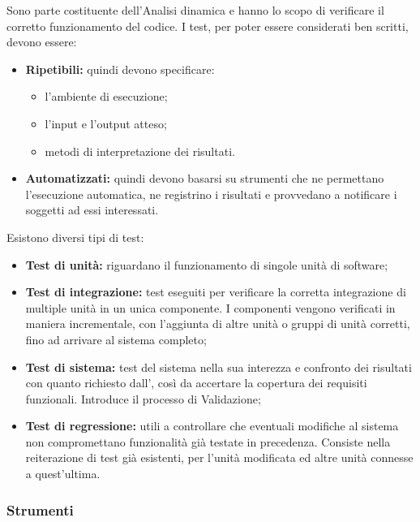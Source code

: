         Sono parte costituente dell'Analisi dinamica e hanno lo scopo di verificare il corretto funzionamento del codice. I test, per poter essere considerati ben scritti, devono essere:
        \begin{itemize}
          \item \textbf{Ripetibili:} quindi devono specificare:
            \begin{itemize}
              \item l'ambiente di esecuzione;
              \item l'input e l'output atteso;
              \item metodi di interpretazione dei risultati.
            \end{itemize}
          \item \textbf{Automatizzati:} quindi devono basarsi su strumenti che ne permettano l'esecuzione automatica, ne registrino i risultati e provvedano a notificare i soggetti ad essi interessati.
        \end{itemize}
        Esistono diversi tipi di test:
        \begin{itemize}
          \item \textbf{Test di unità:} riguardano il funzionamento di singole unità di software;
          \item \textbf{Test di integrazione:} test eseguiti per verificare la corretta integrazione di multiple unità in un unica componente. I componenti vengono verificati in maniera incrementale, con l'aggiunta di altre unità o gruppi di unità corretti, fino ad arrivare al sistema completo;
          \item \textbf{Test di sistema:} test del sistema nella sua interezza e confronto dei risultati con quanto richiesto dall'\AdR{}, così da accertare la copertura dei requisiti funzionali. Introduce il processo di Validazione;
          \item \textbf{Test di regressione:} utili a controllare che eventuali modifiche al sistema non compromettano funzionalità già testate in precedenza. Consiste nella reiterazione di test già esistenti, per l'unità modificata ed altre unità connesse a quest'ultima.
        \end{itemize}

    \subsubsection{Strumenti}


